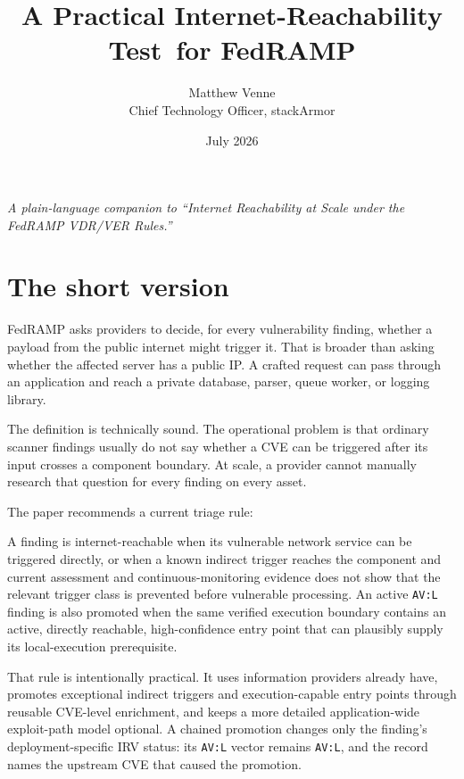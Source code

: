 \documentclass[11pt]{article}
\title{\bfseries A Practical Internet-Reachability Test\ for FedRAMP}
\author{Matthew Venne \\ \small Chief Technology Officer, stackArmor}
\date{July 2026}
\newcommand{\code}[1]{\texttt{#1}}
\begin{document}
\maketitle

\begin{center}
\itshape A plain-language companion to ``Internet Reachability at Scale under
the FedRAMP VDR/VER Rules.''
\end{center}

\bigskip

\section*{The short version}
FedRAMP asks providers to decide, for every vulnerability finding, whether a
payload from the public internet might trigger it. That is broader than asking
whether the affected server has a public IP. A crafted request can pass through
an application and reach a private database, parser, queue worker, or logging
library.

The definition is technically sound. The operational problem is that ordinary
scanner findings usually do not say whether a CVE can be triggered after its
input crosses a component boundary. At scale, a provider cannot manually
research that question for every finding on every asset.

The paper recommends a current triage rule:

\begin{plain}
A finding is internet-reachable when its vulnerable network service can be
triggered directly, or when a known indirect trigger reaches the component and
current assessment and continuous-monitoring evidence does not show that the
relevant trigger class is prevented before vulnerable processing. An active
\code{AV:L} finding is also promoted when the same verified execution boundary
contains an active, directly reachable, high-confidence entry point that can
plausibly supply its local-execution prerequisite.
\end{plain}

That rule is intentionally practical. It uses information providers already
have, promotes exceptional indirect triggers and execution-capable entry points
through reusable CVE-level enrichment, and keeps a more detailed
application-wide exploit-path model optional. A chained promotion changes only
the finding's deployment-specific IRV status: its \code{AV:L} vector remains
\code{AV:L}, and the record names the upstream CVE that caused the promotion.
\end{document}

